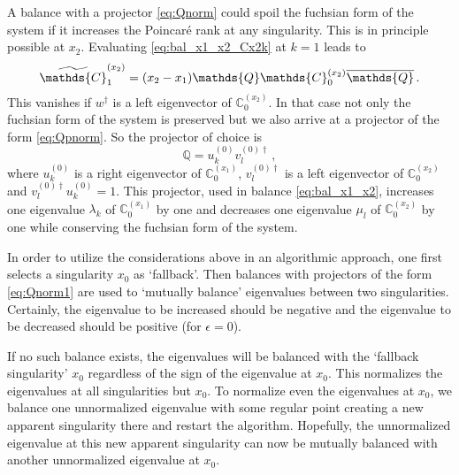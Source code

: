 \documentclass[12pt]{article}
\numberwithin{equation}{section}
\numberwithin{figure}{section}
\newcommand{\C}{\mathds{C}}
\newcommand{\Q}{\mathds{Q}}
\newcommand{\Qbar}{\overline\Q}
\begin{document}
        A balance with a projector \eqref{eq:Qnorm} could spoil the fuchsian form of the system if it increases the Poincar\'{e} rank at any singularity.
        This is in principle possible at $x_2$.
        Evaluating \eqref{eq:bal_x1_x2_Cx2k} at $k=1$ leads to
        \[
          \widetilde \C^{(x_2)}_1 =
          (x_2-x_1)
          \Q \C^{(x_2)}_0 \Qbar\,.
        \]
        This vanishes if $w^\dagger$ is a left eigenvector of $\C^{(x_2)}_0$.
        In that case not only the fuchsian form of the system is preserved but we also arrive at a projector of the form \eqref{eq:Qpnorm}.
				So the projector of choice is 	
        \begin{equation} \label{eq:Qnorm1}
          \Q = u^{(0)}_k v^{(0)\dagger}_l\,,
        \end{equation}
				where $u^{(0)}_k$ is a right eigenvector of $\C^{(x_1)}_0$, $v^{(0)\dagger}_l$ is a left eigenvector of $\C^{(x_2)}_0$ and $v^{(0)\dagger}_l u^{(0)}_k = 1$.
				This projector, used in balance \eqref{eq:bal_x1_x2}, increases one eigenvalue $\lambda_k$ of $\C^{(x_1)}_0$ by one and decreases one eigenvalue $\mu_l$ of $\C^{(x_2)}_0$ by one while conserving the fuchsian form of the system.

 			  In order to utilize the considerations above in an algorithmic approach, one first selects a singularity $x_0$ as `fallback'.
        Then balances with projectors of the form \eqref{eq:Qnorm1} are used to `mutually balance' eigenvalues between two singularities. 
        Certainly, the eigenvalue to be increased should be negative and the eigenvalue to be decreased should be positive (for $\epsilon=0$).

        If no such balance exists, the eigenvalues will be balanced with the `fallback singularity' $x_0$ regardless of the sign of the eigenvalue at $x_0$.
        This normalizes the eigenvalues at all singularities but $x_0$.
        To normalize even the eigenvalues at $x_0$, we balance one unnormalized eigenvalue with some regular point creating a new apparent singularity there and restart the algorithm.
        Hopefully, the unnormalized eigenvalue at this new apparent singularity can now be mutually balanced with another unnormalized eigenvalue at $x_0$.
\end{document}
